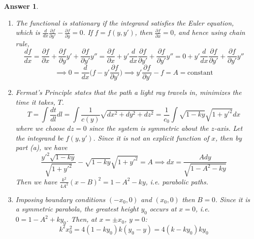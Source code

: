 \documentclass[a4paper]{article}
\newtheorem{ans}{Answer}[section]
\theoremstyle{new}
\begin{document}
\begin{ans}\leavevmode
\begin{enumerate}[label=(\alph*)]
\item The functional is stationary if the integrand satisfies the Euler equation, which is $\frac{d}{dx}\frac{\partial f}{\partial y'}-\frac{\partial f}{\partial y}=0$. If  $f=f(y,y')$, then $\frac{\partial f}{\partial x}=0$, and hence using chain rule,
$$\frac{df}{dx}=\frac{\partial f}{\partial x}+\frac{\partial f}{\partial y}y'+\frac{\partial f}{\partial y'}y''=\frac{\partial f}{\partial x}+y'\frac{d}{dx}\frac{\partial f}{\partial y'}+\frac{\partial f}{\partial y'}y''=0+y'\frac{d}{dx}\frac{\partial f}{\partial y'}+\frac{\partial f}{\partial y'}y''$$
$$\implies 0=\frac{d}{dx}\bigg(f-y'\frac{\partial f}{\partial y'}\bigg)\implies y'\frac{\partial f}{\partial y'}-f=A=\text{constant}$$
\item Fermat's Principle states that the path a light ray travels in, minimizes the time it takes, $T$.
$$T=\int\frac{dt}{dl}dl=\int\frac{1}{c(y)}\sqrt{dx^2+dy^2+dz^2}=\frac{1}{c_0}\int\sqrt{1-ky}\sqrt{1+y'^2}dx$$
where we choose $dz=0$ since the system is symmetric about the $z$-axis. Let the integrand be $f(y,y')$. Since it is not an explicit function of $x$, then by part (a), we have
$$\frac{y'^2\sqrt{1-ky}}{\sqrt{1+y'^2}}-\sqrt{1-ky}\sqrt{1+y'^2}=A\implies dx=\frac{Ady}{\sqrt{1-A^2-ky}}$$
Then we have $\frac{k^2}{4A^2}(x-B)^2=1-A^2-ky$, i.e. parabolic paths.
\item Imposing boundary conditions $(-x_0,0)$ and $(x_0,0)$ then $B=0$. Since it is a symmetric parabola, the greatest height $y_0$ occurs at $x=0$, i.e. $0=1-A^2+ky_0$. Then, at $x=\pm x_0$, $y=0$:
$$k^2x_0^2=4(1-ky_0)k(y_0-y)=4(k-ky_0)ky_0$$
\end{enumerate}
\end{ans}
\newpage
\end{document}
